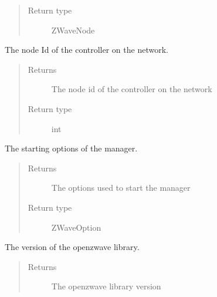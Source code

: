 \documentclass[letterpaper,10pt,english]{sphinxmanual}
\begin{document}
\begin{fulllineitems}
\begin{fulllineitems}
\begin{quote}
\begin{description}
\item[{Return type}] \leavevmode
ZWaveNode

\end{description}\end{quote}

\end{fulllineitems}


\begin{fulllineitems}
\label{controller:openzwave.controller.ZWaveController.node_id}
The node Id of the controller on the network.
\begin{quote}\begin{description}
\item[{Returns}] \leavevmode
The node id of the controller on the network

\item[{Return type}] \leavevmode
int

\end{description}\end{quote}

\end{fulllineitems}


\begin{fulllineitems}
\label{controller:openzwave.controller.ZWaveController.options}
The starting options of the manager.
\begin{quote}\begin{description}
\item[{Returns}] \leavevmode
The options used to start the manager

\item[{Return type}] \leavevmode
ZWaveOption

\end{description}\end{quote}

\end{fulllineitems}


\begin{fulllineitems}
\label{controller:openzwave.controller.ZWaveController.ozw_library_version}
The version of the openzwave library.
\begin{quote}\begin{description}
\item[{Returns}] \leavevmode
The openzwave library version


\end{description}
\end{quote}
\end{fulllineitems}
\end{fulllineitems}
\end{document}
